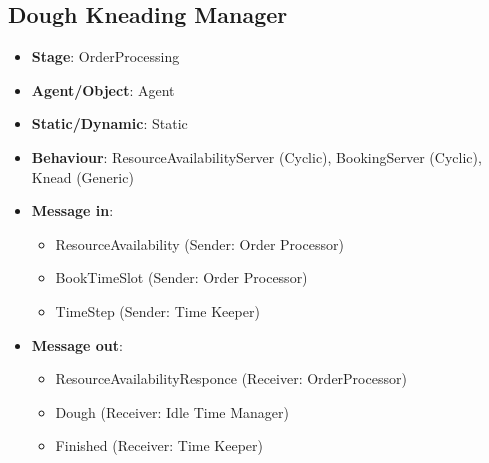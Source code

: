 \documentclass[12pt]{article}
\begin{document}
\subsection{Dough Kneading Manager}%
\label{sub:knead_manager}
\begin{itemize}
    \item \textbf{Stage}: OrderProcessing
    \item \textbf{Agent/Object}: Agent
    \item \textbf{Static/Dynamic}: Static
    \item \textbf{Behaviour}: ResourceAvailabilityServer (Cyclic), BookingServer (Cyclic), Knead (Generic)
    \item \textbf{Message in}:
        \begin{itemize}
            \item ResourceAvailability (Sender: Order Processor)
            \item BookTimeSlot (Sender: Order Processor)
            \item TimeStep (Sender: Time Keeper)
        \end{itemize}
    \item \textbf{Message out}:
        \begin{itemize}
            \item ResourceAvailabilityResponce (Receiver: OrderProcessor)
            \item Dough (Receiver: Idle Time Manager)
            \item Finished (Receiver: Time Keeper)
        \end{itemize}
\end{itemize}
\end{document}
